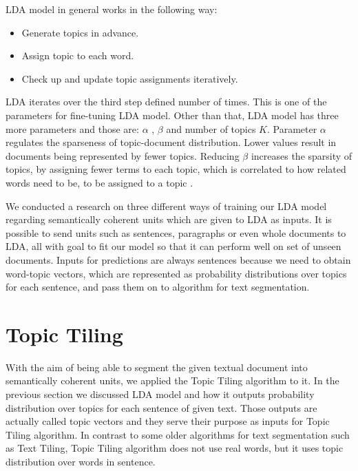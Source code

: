 \documentclass[10pt, a4paper]{article}
\begin{document}
LDA model in general works in the following way:
\begin{itemize}
\item Generate topics in advance.
\item Assign topic to each word.
\item Check up and update topic assignments iteratively.
\end{itemize}
LDA iterates over the third step defined number of times. This is one of the parameters for fine-tuning LDA model. Other than that, LDA model has three more parameters and those are: $\alpha$ , $\beta$ and number of topics $K$. Parameter $\alpha$ regulates the sparseness of topic-document distribution. Lower values result in documents being represented by fewer topics. Reducing $\beta$ increases the sparsity of topics, by assigning fewer terms to each topic, which is correlated to how related words need to be, to be assigned to a topic \citep{ref-asistent}.

We conducted a research on three different ways of training our LDA model regarding semantically coherent units which are given to LDA as inputs. It is possible to send units such as sentences, paragraphs or even whole documents to LDA, all with goal to fit our model so that it can perform well on set of unseen documents. Inputs for predictions are always sentences because we need to obtain word-topic vectors, which are represented as probability distributions over topics for each sentence, and pass them on to algorithm for text segmentation.


\section{Topic Tiling}
With the aim of being able to segment the given textual document into semantically coherent units, we applied the Topic Tiling algorithm to it. In the previous section we discussed LDA model and how it outputs probability distribution over topics for each sentence of given text. Those outputs are actually called topic vectors and they serve their purpose as inputs for Topic Tiling algorithm. In contrast to some older algorithms for text segmentation such as Text Tiling, Topic Tiling algorithm does not use real words, but it uses topic distribution over words in sentence. 
\end{document}
